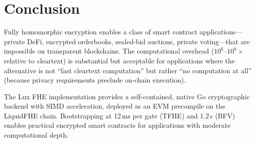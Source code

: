 \section{Conclusion}


Fully homomorphic encryption enables a class of smart contract applications---private
DeFi, encrypted orderbooks, sealed-bid auctions, private voting---that are impossible
on transparent blockchains. The computational overhead ($10^6$--$10^8\times$ relative
to cleartext) is substantial but acceptable for applications where the alternative is
not ``fast cleartext computation'' but rather ``no computation at all'' (because
privacy requirements preclude on-chain execution).

The Lux FHE implementation provides a self-contained, native Go cryptographic backend
with SIMD acceleration, deployed as an EVM precompile on the LiquidFHE chain.
Bootstrapping at 12\,ms per gate (TFHE) and 1.2\,s (BFV) enables practical encrypted
smart contracts for applications with moderate computational depth.

